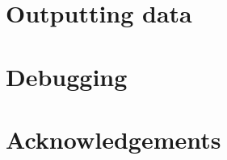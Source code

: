 \section{Outputting data}
\label{sec:data}


\section{Debugging}
\label{sec:debugging}


\section{Acknowledgements}

\begin{thebibliography}{9}
\end{thebibliography}


